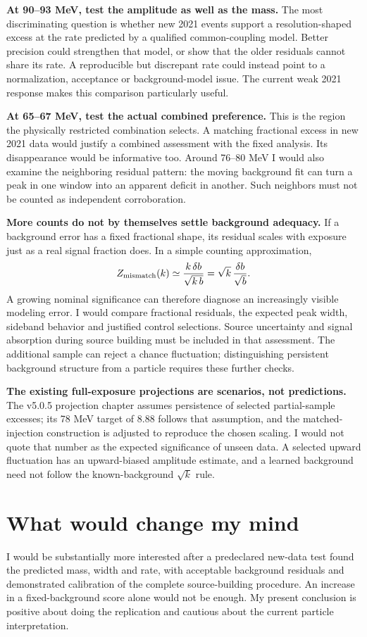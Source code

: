 \documentclass[11pt]{article}
\begin{document}
\textbf{At 90--93 MeV, test the amplitude as well as the mass.} The most discriminating question is whether new 2021 events support a resolution-shaped excess at the rate predicted by a qualified common-coupling model. Better precision could strengthen that model, or show that the older residuals cannot share its rate. A reproducible but discrepant rate could instead point to a normalization, acceptance or background-model issue. The current weak 2021 response makes this comparison particularly useful.

\textbf{At 65--67 MeV, test the actual combined preference.} This is the region the physically restricted combination selects. A matching fractional excess in new 2021 data would justify a combined assessment with the fixed analysis. Its disappearance would be informative too. Around 76--80 MeV I would also examine the neighboring residual pattern: the moving background fit can turn a peak in one window into an apparent deficit in another. Such neighbors must not be counted as independent corroboration.

\textbf{More counts do not by themselves settle background adequacy.} If a background error has a fixed fractional shape, its residual scales with exposure just as a real signal fraction does. In a simple counting approximation,
\[
 Z_{\rm mismatch}(k)\simeq
 \frac{k\,\delta b}{\sqrt{k\,b}}
 =\sqrt{k}\,\frac{\delta b}{\sqrt b}.
\]
A growing nominal significance can therefore diagnose an increasingly visible modeling error. I would compare fractional residuals, the expected peak width, sideband behavior and justified control selections. Source uncertainty and signal absorption during source building must be included in that assessment. The additional sample can reject a chance fluctuation; distinguishing persistent background structure from a particle requires these further checks.

\textbf{The existing full-exposure projections are scenarios, not predictions.} The v5.0.5 projection chapter assumes persistence of selected partial-sample excesses; its 78 MeV target of 8.88 follows that assumption, and the matched-injection construction is adjusted to reproduce the chosen scaling. I would not quote that number as the expected significance of unseen data. A selected upward fluctuation has an upward-biased amplitude estimate, and a learned background need not follow the known-background $\sqrt{k}$ rule.

\section*{What would change my mind}
I would be substantially more interested after a predeclared new-data test found the predicted mass, width and rate, with acceptable background residuals and demonstrated calibration of the complete source-building procedure. An increase in a fixed-background score alone would not be enough. My present conclusion is positive about doing the replication and cautious about the current particle interpretation.
\end{document}
